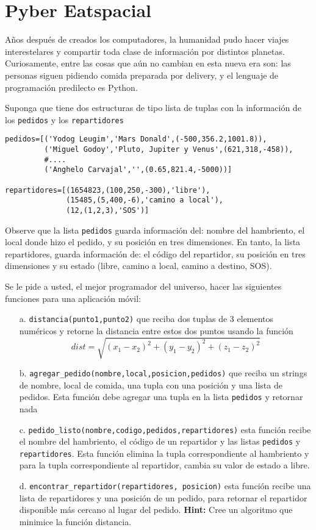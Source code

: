 \section{Pyber Eatspacial}

Años después de creados los computadores, la humanidad pudo hacer viajes interestelares y compartir toda clase de información por distintos planetas. Curiosamente, entre las cosas que aún no cambian en esta nueva era son: las personas siguen pidiendo comida preparada por delivery, y el lenguaje de programación predilecto es Python.

Suponga que tiene dos estructuras de tipo lista de tuplas con la información de los \texttt{pedidos} y los \texttt{repartidores}
\begin{lstlisting}[style=consola]
pedidos=[('Yodog Leugim','Mars Donald',(-500,356.2,1001.8)),
         ('Miguel Godoy','Pluto, Jupiter y Venus',(621,318,-458)),
         #....
         ('Anghelo Carvajal','',(0.65,821.4,-5000))]

repartidores=[(1654823,(100,250,-300),'libre'),
              (15485,(5,400,-6),'camino a local'),
              (12,(1,2,3),'SOS')]
\end{lstlisting}

Observe que la lista \texttt{pedidos} guarda información del: nombre del hambriento, el local donde hizo el pedido, y su posición en tres dimensiones. En tanto, la lista repartidores, guarda información de: el código del repartidor, su posición en tres dimensiones y su estado (libre, camino a local, camino a destino, SOS).

Se le pide a usted, el mejor programador del universo, hacer las siguientes funciones para una aplicación móvil:

\begin{itemize}
    \item[a.] \texttt{distancia(punto1,punto2)} que reciba dos tuplas de 3 elementos numéricos y retorne la distancia entre estos dos puntos usando la función
    $$ dist=\sqrt{(x_1 - x_2)^2 + (y_1 - y_2 )^2 + (z_1 - z_2)^2}$$
    \item[b.] \texttt{agregar\_pedido(nombre,local,posicion,pedidos)} que reciba un strings de nombre, local de comida, una tupla con una posición y una lista de pedidos. Esta función debe agregar una tupla en la lista \texttt{pedidos} y retornar nada
    \item[c.] \texttt{pedido\_listo(nombre,codigo,pedidos,repartidores)} esta función recibe el nombre del hambriento, el código de un repartidor y las listas \texttt{pedidos} y \texttt{repartidores}. Esta función elimina la tupla correspondiente al hambriento y para la tupla correspondiente al repartidor, cambia su valor de estado a libre.
    \item[d.] \texttt{encontrar\_repartidor(repartidores, posicion)} esta función recibe una lista de repartidores y una posición de un pedido, para retornar el repartidor disponible más cercano al lugar del pedido. \textbf{Hint:} Cree un algoritmo que minimice la función distancia.
\end{itemize}